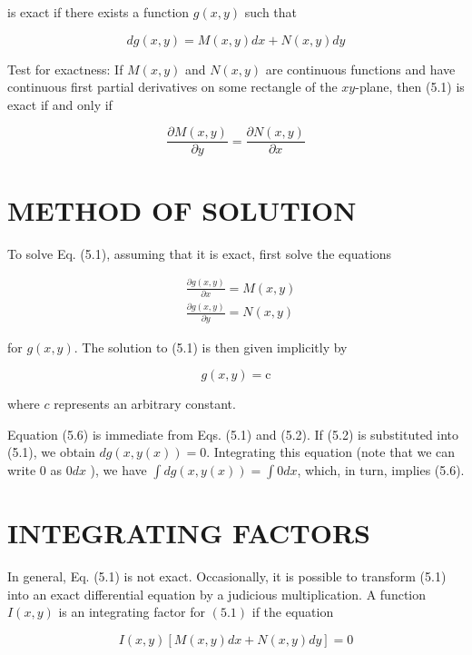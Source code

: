 \documentclass[10pt]{article}
\begin{document}
is exact if there exists a function $g(x, y)$ such that


\begin{equation*}
d g(x, y)=M(x, y) d x+N(x, y) d y \tag{5.2}
\end{equation*}


Test for exactness: If $M(x, y)$ and $N(x, y)$ are continuous functions and have continuous first partial derivatives on some rectangle of the $x y$-plane, then (5.1) is exact if and only if


\begin{equation*}
\frac{\partial M(x, y)}{\partial y}=\frac{\partial N(x, y)}{\partial x} \tag{5.3}
\end{equation*}


\section*{METHOD OF SOLUTION}
To solve Eq. (5.1), assuming that it is exact, first solve the equations


\begin{align*}
& \frac{\partial g(x, y)}{\partial x}=M(x, y)  \tag{5.4}\\
& \frac{\partial g(x, y)}{\partial y}=N(x, y) \tag{5.5}
\end{align*}


for $g(x, y)$. The solution to (5.1) is then given implicitly by


\begin{equation*}
g(x, y)=\mathrm{c} \tag{5.6}
\end{equation*}


where $c$ represents an arbitrary constant.

Equation (5.6) is immediate from Eqs. (5.1) and (5.2). If (5.2) is substituted into (5.1), we obtain $d g(x, y(x))=0$. Integrating this equation (note that we can write 0 as $0 d x$ ), we have $\int d g(x, y(x))=\int 0 d x$, which, in turn, implies (5.6).

\section*{INTEGRATING FACTORS}
In general, Eq. (5.1) is not exact. Occasionally, it is possible to transform (5.1) into an exact differential equation by a judicious multiplication. A function $I(x, y)$ is an integrating factor for $(5.1)$ if the equation


\begin{equation*}
I(x, y)[M(x, y) d x+N(x, y) d y]=0 \tag{5.7}
\end{equation*}
\end{document}
